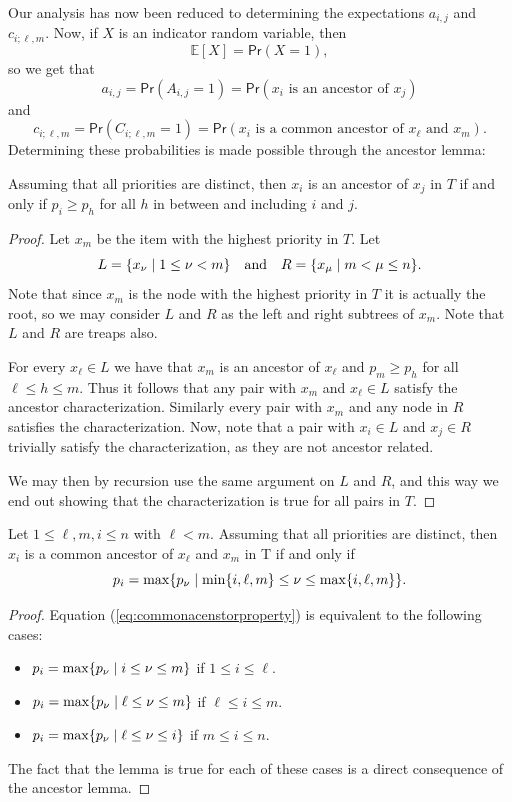 Our analysis has now been reduced to determining the expectations $a_{i,j}$ and $c_{i;\ell,m}$. Now, if $X$ is an indicator random variable, then
\[
    \mathbb{E}[X] = \textsf{Pr}(X = 1),
\]
so we get that
\[
    a_{i,j} = \textsf{Pr}(A_{i,j} = 1) = \textsf{Pr}(x_i \text{ is an ancestor of } x_j)
\]
and
\[
    c_{i;\ell,m} = \textsf{Pr}(C_{i;\ell,m} = 1) = \textsf{Pr}(x_i \text{ is a common ancestor of } x_{\ell} \text{ and } x_{m}).
\]
Determining these probabilities is made possible through the ancestor lemma:
\begin{lem}
Assuming that all priorities are distinct, then $x_i$ is an ancestor of $x_j$ in $T$ if and only if $p_i \geq p_h$ for all $h$ in between and including $i$ and $j$.
\end{lem}
\begin{proof}
Let $x_m$ be the item with the highest priority in $T$. Let
\[
    L = \{x_{\nu} \mid 1 \leq \nu < m\}
    \quad
    \text{and}
    \quad
    R = \{x_{\mu} \mid m < \mu \leq n\}.
\]
Note that since $x_m$ is the node with the highest priority in $T$ it is actually the root, so we may consider $L$ and $R$ as the left and right subtrees of $x_m$. Note that $L$ and $R$ are treaps also.

For every $x_{\ell} \in L$ we have that $x_m$ is an ancestor of $x_{\ell}$ and $p_m \geq p_h$ for all $\ell \leq h \leq m$. Thus it follows that any pair with $x_m$ and $x_{\ell} \in L$ satisfy the ancestor characterization. Similarly every pair with $x_m$ and any node in $R$ satisfies the characterization. Now, note that a pair with $x_i \in L$ and $x_j \in R$ trivially satisfy the characterization, as they are not ancestor related.

We may then by recursion use the same argument on $L$ and $R$, and this way we end out showing that the characterization is true for all pairs in $T$.
\end{proof}

\begin{lem}
Let $1 \leq \ell, m, i \leq n$ with $\ell < m$. Assuming that all priorities are distinct, then $x_i$ is a common ancestor of $x_{\ell}$ and $x_m$ in T if and only if
\begin{equation} \label{eq:commonacenstorproperty}
    p_i = \max\{p_{\nu} \mid \min\{i,\ell,m\} \leq \nu \leq \max\{i,\ell,m\}\}.
\end{equation}
\end{lem}
\begin{proof}
Equation (\ref{eq:commonacenstorproperty}) is equivalent to the following cases:
\begin{itemize}
    \item $p_i = \max\{p_{\nu} \mid i \leq \nu \leq m\}$ if $1 \leq i \leq \ell$.
    \item $p_i = \max\{p_{\nu} \mid \ell \leq \nu \leq m\}$ if $\ell \leq i \leq m$.
    \item $p_i = \max\{p_{\nu} \mid \ell \leq \nu \leq i\}$ if $m \leq i \leq n$.
\end{itemize}
The fact that the lemma is true for each of these cases is a direct consequence of the ancestor lemma.
\end{proof}


